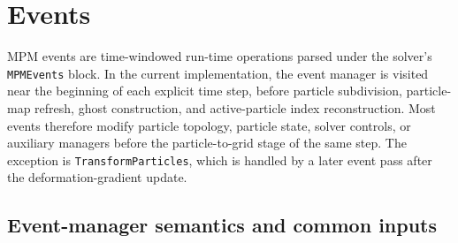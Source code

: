 \section{Events}
\label{sec:events}

MPM events are time-windowed run-time operations parsed under the solver's \texttt{MPMEvents} block.  In the current implementation, the event manager is visited near the beginning of each explicit time step, before particle subdivision, particle-map refresh, ghost construction, and active-particle index reconstruction.  Most events therefore modify particle topology, particle state, solver controls, or auxiliary managers before the particle-to-grid stage of the same step.  The exception is \texttt{TransformParticles}, which is handled by a later event pass after the deformation-gradient update.

\subsection{Event-manager semantics and common inputs}
\label{subsec:event-manager-semantics}

